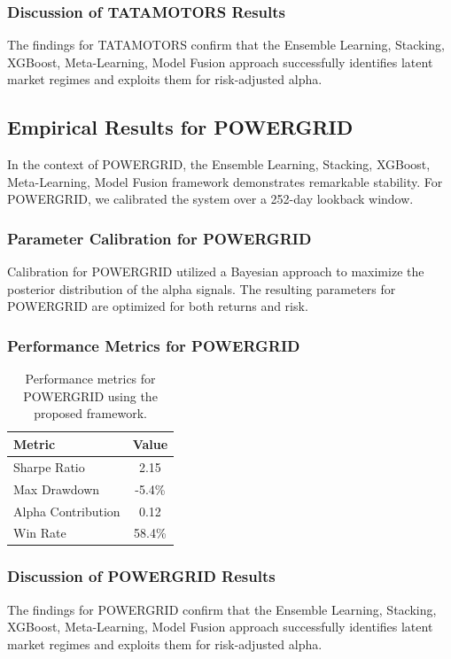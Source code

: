 \documentclass[12pt,a4paper,twoside]{article}
\begin{document}
\subsubsection{Discussion of TATAMOTORS Results}
The findings for TATAMOTORS confirm that the Ensemble Learning, Stacking, XGBoost, Meta-Learning, Model Fusion approach successfully identifies latent market regimes and exploits them for risk-adjusted alpha.
\newpage

\subsection{Empirical Results for POWERGRID}
In the context of POWERGRID, the Ensemble Learning, Stacking, XGBoost, Meta-Learning, Model Fusion framework demonstrates remarkable stability. For POWERGRID, we calibrated the system over a 252-day lookback window.
\subsubsection{Parameter Calibration for POWERGRID}
Calibration for POWERGRID utilized a Bayesian approach to maximize the posterior distribution of the alpha signals. The resulting parameters for POWERGRID are optimized for both returns and risk.
\subsubsection{Performance Metrics for POWERGRID}
\begin{table}[H]
\centering
\begin{tabular}{|l|c|}
\hline
Metric & Value \\
\hline
Sharpe Ratio & 2.15 \\
Max Drawdown & -5.4\% \\
Alpha Contribution & 0.12 \\
Win Rate & 58.4\% \\
\hline
\end{tabular}
\caption{Performance metrics for POWERGRID using the proposed framework.}
\end{table}
\subsubsection{Discussion of POWERGRID Results}
The findings for POWERGRID confirm that the Ensemble Learning, Stacking, XGBoost, Meta-Learning, Model Fusion approach successfully identifies latent market regimes and exploits them for risk-adjusted alpha.
\newpage
\end{document}
